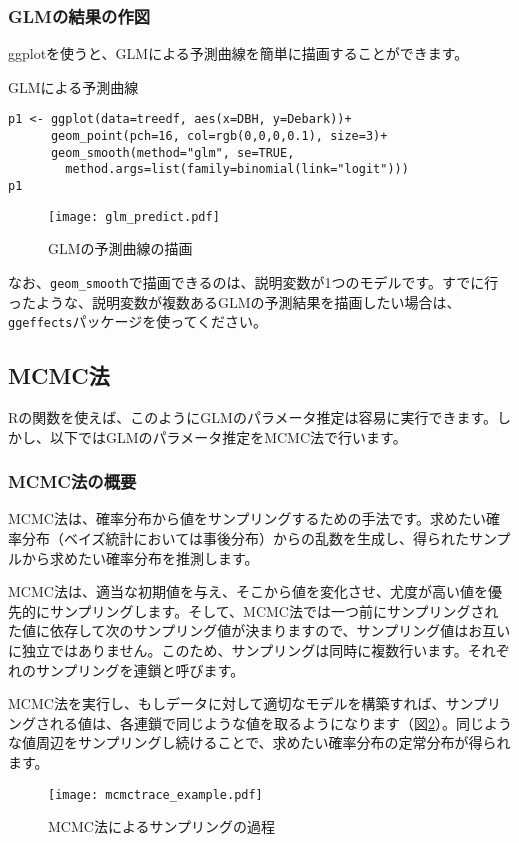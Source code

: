     \subsubsection{GLMの結果の作図}
ggplotを使うと、GLMによる予測曲線を簡単に描画することができます。
\begin{itembox}[l]{GLMによる予測曲線}
\begin{verbatim}
p1 <- ggplot(data=treedf, aes(x=DBH, y=Debark))+
      geom_point(pch=16, col=rgb(0,0,0,0.1), size=3)+
      geom_smooth(method="glm", se=TRUE,
        method.args=list(family=binomial(link="logit")))
p1
\end{verbatim}
\end{itembox}
\begin{figure}[htb]
\begin{center}
\graphicspath{{3_glm/figs/}}
\texttt{[image: glm\_predict.pdf]}\\
\caption{GLMの予測曲線の描画}
\label{glm_predict}
\end{center}
\end{figure}
なお、\verb|geom_smooth|で描画できるのは、説明変数が1つのモデルです。すでに行ったような、説明変数が複数あるGLMの予測結果を描画したい場合は、\verb|ggeffects|パッケージを使ってください。

	\subsection{MCMC法}
Rの関数を使えば、このようにGLMのパラメータ推定は容易に実行できます。しかし、以下ではGLMのパラメータ推定をMCMC法で行います。
\subsubsection{MCMC法の概要}
MCMC法は、確率分布から値をサンプリングするための手法です。求めたい確率分布（ベイズ統計においては事後分布）からの乱数を生成し、得られたサンプルから求めたい確率分布を推測します。

MCMC法は、適当な初期値を与え、そこから値を変化させ、尤度が高い値を優先的にサンプリングします。そして、MCMC法では一つ前にサンプリングされた値に依存して次のサンプリング値が決まりますので、サンプリング値はお互いに独立ではありません。このため、サンプリングは同時に複数行います。それぞれのサンプリングを連鎖と呼びます。

MCMC法を実行し、もしデータに対して適切なモデルを構築すれば、サンプリングされる値は、各連鎖で同じような値を取るようになります（図\ref{mcmctrace_example}）。同じような値周辺をサンプリングし続けることで、求めたい確率分布の定常分布が得られます。
\begin{figure}[htb]
\begin{center}
\graphicspath{{3_glm/figs/}}
\texttt{[image: mcmctrace\_example.pdf]}\\
\caption{MCMC法によるサンプリングの過程}
\label{mcmctrace_example}
\end{center}
\end{figure}

